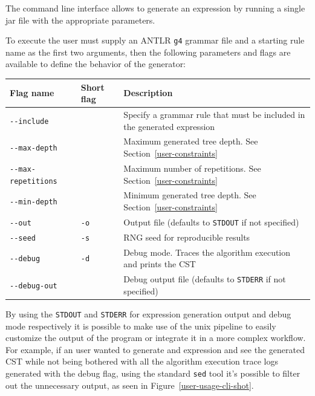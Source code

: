 \documentclass[]{usiinfbachelorproject}
\begin{document}
The command line interface allows to generate an expression by running a single
jar file with the appropriate parameters.

To execute the user must supply an ANTLR \texttt{g4} grammar file and
a starting rule name as the first two arguments, then the following parameters
and flags are available to define the behavior of the generator:

\vspace{1em}

\begin{tabular}{lll}
Flag name                    & Short flag  & Description \\\toprule
\texttt{-{}-include}         &             & Specify a grammar rule that must be included in the generated expression \\
\texttt{-{}-max-depth}       &             & Maximum generated tree depth. See Section~\ref{user-constraints} \\
\texttt{-{}-max-repetitions} &             & Maximum number of repetitions. See Section~\ref{user-constraints} \\
\texttt{-{}-min-depth}       &             & Minimum generated tree depth. See Section~\ref{user-constraints} \\
\texttt{-{}-out}             & \texttt{-o} & Output file (defaults to \texttt{STDOUT} if not specified) \\
\texttt{-{}-seed}            & \texttt{-s} & RNG seed for reproducible results \\
\texttt{-{}-debug}           & \texttt{-d} & Debug mode. Traces the algorithm execution and prints the CST \\
\texttt{-{}-debug-out}       &             & Debug output file (defaults to \texttt{STDERR} if not specified) \\
\end{tabular}

\vspace{1em}

By using the \texttt{STDOUT} and \texttt{STDERR} for expression generation
output and debug mode respectively it is possible to make use of the
unix pipeline to easily customize the output of the program or integrate it
in a more complex workflow. For example, if an user wanted to generate and
expression and see the generated CST while not being bothered with all the
algorithm execution trace logs generated with the debug flag, using the
standard \texttt{sed} tool it's possible to filter out the unnecessary output,
as seen in Figure~\ref{user-usage-cli-shot}.
\end{document}
